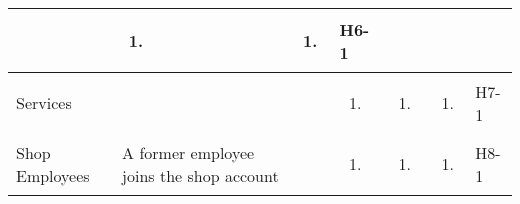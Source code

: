 \documentclass{article}
\begin{document}
\begin{landscape}
\begin{table}[H]
\begin{adjustbox}{width=\paperwidth}
\begin{tabular}{|p{}|p{}|p{}|p{}|p{}|p{}|p{}|}
				               & \begin{enumerate}[label=\alph*., leftmargin=*]
					                 \item
				                 \end{enumerate}
				               & \begin{enumerate}[label=\alph*., leftmargin=*]
					                 \item
				                 \end{enumerate}
				               & H6-1                                                                            \\
				\hline
				Services
				               & ~
				               & ~
				               & \begin{enumerate}[label=\alph*., leftmargin=*]
					                 \item
				                 \end{enumerate}
				               & \begin{enumerate}[label=\alph*., leftmargin=*]
					                 \item
				                 \end{enumerate}
				               & \begin{enumerate}[label=\alph*., leftmargin=*]
					                 \item
				                 \end{enumerate}
				               & H7-1                                                                            \\
				\hline
				Shop Employees & A former employee joins the shop account
				               & ~
				               & \begin{enumerate}[label=\alph*., leftmargin=*]
					                 \item
				                 \end{enumerate}
				               & \begin{enumerate}[label=\alph*., leftmargin=*]
					                 \item
				                 \end{enumerate}
				               & \begin{enumerate}[label=\alph*., leftmargin=*]
					                 \item
				                 \end{enumerate}
				               & H8-1                                                                            \\
				\hline
			\end{tabular}
		\end{adjustbox}
	\end{table}
\end{landscape}
\end{document}
